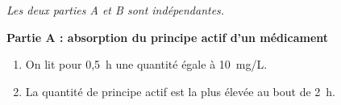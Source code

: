 
\medskip

\emph{Les deux parties {\rm A} et {\rm B} sont indépendantes.}

\medskip

\textbf{Partie A : absorption du principe actif d'un médicament}

\smallskip

%
%
%
%
%
%

\begin{enumerate}
	\item  %
On lit pour 0,5~h une quantité égale à 10~mg/L.	
	\item %
La quantité de principe actif est la plus élevée au bout de 2~h.
\end{enumerate}

